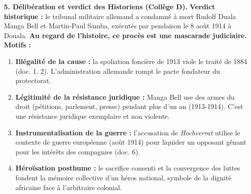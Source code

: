\documentclass[11pt]{article}
\newcommand{\cle}[1]{{\popxbold\color{popdark}#1}}
\begin{document}
\begin{exoresolu}
\textbf{5. Délibération et verdict des Historiens (Collège D).}
\og \textbf{Verdict historique :} le tribunal militaire allemand a condamné à mort Rudolf Duala Manga Bell et Martin-Paul Samba, exécutés par pendaison le 8 août 1914 à Douala. \textbf{Au regard de l'histoire, ce procès est une mascarade judiciaire.}
\textbf{Motifs :}
\begin{enumerate}
    \item \textbf{Illégalité de la cause :} la spoliation foncière de 1913 viole le traité de 1884 (doc. 1, 2). L'administration allemande rompt le pacte fondateur du protectorat.
    \item \textbf{Légitimité de la résistance juridique :} Manga Bell use des armes du droit (pétitions, parlement, presse) pendant plus d'un an (1913-1914). C'est une \cle{résistance juridique} exemplaire et non violente.
    \item \textbf{Instrumentalisation de la guerre :} l'accusation de \emph{Hochverrat} utilise le contexte de guerre européenne (août 1914) pour liquider un opposant gênant pour les intérêts des compagnies (doc. 6).
    \item \textbf{Héroïsation posthume :} le sacrifice consenti et la convergence des luttes fondent la \cle{mémoire collective} d'un héros national, symbole de la dignité africaine face à l'arbitraire colonial.
\end{enumerate}
\fg


\end{exoresolu}
\end{document}
